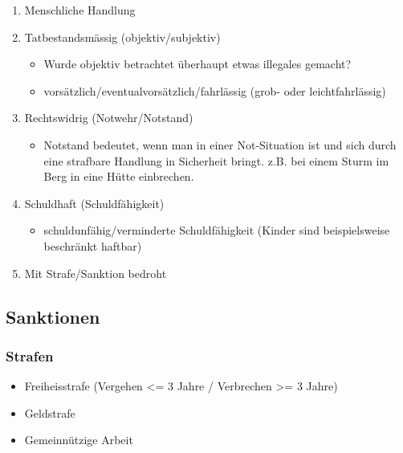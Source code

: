 \begin{enumerate}
\def\labelenumi{\arabic{enumi}.}
\tightlist
\item
  Menschliche Handlung
\item
  Tatbestandsmässig (objektiv/subjektiv)

  \begin{itemize}
  \tightlist
  \item
    Wurde objektiv betrachtet überhaupt etwas illegales gemacht?
  \item
    vorsätzlich/eventualvorsätzlich/fahrlässig (grob- oder
    leichtfahrlässig)
  \end{itemize}
\item
  Rechtswidrig (Notwehr/Notstand)

  \begin{itemize}
  \tightlist
  \item
    Notstand bedeutet, wenn man in einer Not-Situation ist und sich
    durch eine strafbare Handlung in Sicherheit bringt. z.B. bei einem
    Sturm im Berg in eine Hütte einbrechen.
  \end{itemize}
\item
  Schuldhaft (Schuldfähigkeit)

  \begin{itemize}
  \tightlist
  \item
    schuldunfähig/verminderte Schuldfähigkeit (Kinder sind
    beispielsweise beschränkt haftbar)
  \end{itemize}
\item
  Mit Strafe/Sanktion bedroht
\end{enumerate}

\hypertarget{sanktionen}{%
\subsection{Sanktionen}\label{sanktionen}}

\hypertarget{strafen}{%
\subsubsection{Strafen}\label{strafen}}

\begin{itemize}
\tightlist
\item
  Freiheisstrafe (Vergehen \textless{}= 3 Jahre / Verbrechen
  \textgreater{}= 3 Jahre)
\item
  Geldstrafe
\item
  Gemeinnützige Arbeit
\end{itemize}

